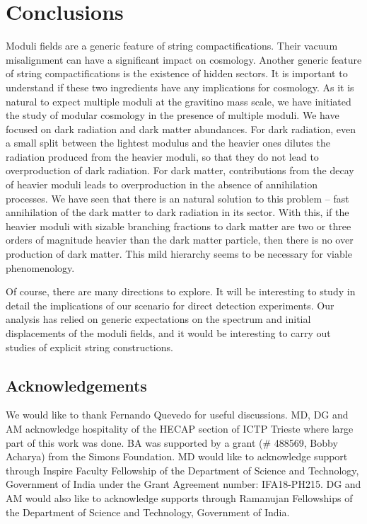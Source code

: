 \documentclass[12pt]{article}
\numberwithin{equation}{section}
\begin{document}
\section{Conclusions}

Moduli fields are a generic feature of string compactifications.  Their vacuum misalignment 
can have a significant impact on cosmology. Another generic feature of string compactifications is the existence of
hidden sectors. It is important to understand if these two ingredients have any implications
for cosmology. As it is natural to expect multiple moduli at the gravitino mass scale, we have
initiated the study of modular cosmology in the presence of multiple moduli. We have focused  on
dark radiation and dark matter abundances. For dark radiation, even a small split between the lightest
modulus and the heavier ones dilutes the radiation produced from the heavier moduli, so that
they do not lead to overproduction of dark radiation. For dark matter, contributions from the 
decay of heavier moduli leads to overproduction in the absence of annihilation processes. We 
have seen that there is an natural solution to this problem -- fast annihilation of the dark matter to
dark radiation in its sector. With this, if the heavier moduli with sizable branching fractions to dark
matter are two or three orders of magnitude heavier than the dark matter particle, then there is no over
production of dark matter. This mild hierarchy seems to be necessary for viable phenomenology.

Of course, there are many  directions to explore. 
It will be interesting to study in detail the implications of our scenario for direct detection experiments.  Our analysis has
relied on generic expectations on the spectrum and initial displacements of the moduli fields, and  it would be interesting to carry out
studies of explicit string constructions. 

\subsection*{Acknowledgements}


We would like to thank Fernando Quevedo for useful discussions. 
MD, DG and AM acknowledge hospitality of the HECAP section of ICTP Trieste where large part of this work was done.
BA was supported by a grant  ($\#$ 488569, Bobby Acharya) from the Simons Foundation.
MD would like to acknowledge support through Inspire Faculty Fellowship of the Department of Science and Technology, Government
of India under the Grant Agreement number: IFA18-PH215. DG and AM would also like to acknowledge supports through
Ramanujan Fellowships of the Department of Science and Technology, Government of India.  
\end{document}
